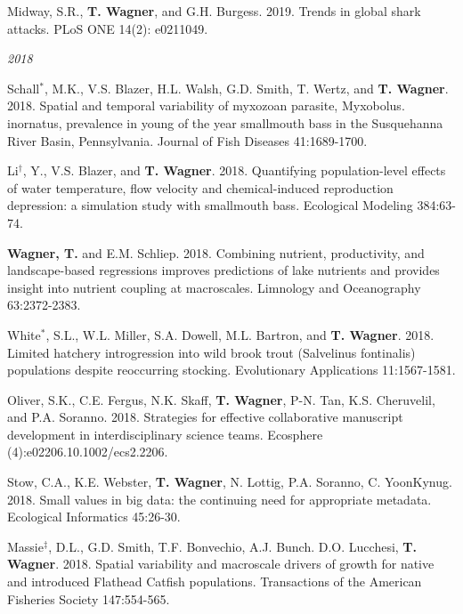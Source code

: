 \documentclass[10pt]{article}
\begin{document}
\begin{flushleft}
\begin{etaremune}[start=91]
\item Midway, S.R., \textbf{T. Wagner}, and G.H. Burgess. 2019. Trends in global shark attacks. PLoS ONE
14(2): e0211049.

\end{etaremune}

\emph{2018}
\begin{etaremune}[start=81]
\item Schall$^*$, M.K., V.S. Blazer, H.L. Walsh, G.D. Smith, T. Wertz, and \textbf{T. Wagner}. 2018. Spatial and temporal variability of myxozoan parasite, Myxobolus. inornatus, prevalence in young of the year smallmouth bass in the Susquehanna River Basin, Pennsylvania. Journal of Fish Diseases 41:1689-1700.

\item Li$^\dagger$, Y., V.S. Blazer, and \textbf{T. Wagner}. 2018. Quantifying population-level effects of water temperature, flow velocity and chemical-induced reproduction depression: a simulation study with smallmouth bass. Ecological Modeling 384:63-74.

\item {\bf Wagner, T.} and E.M. Schliep. 2018. Combining nutrient, productivity, and landscape-based regressions improves predictions of lake nutrients and provides insight into nutrient coupling at macroscales. Limnology and Oceanography 63:2372-2383.

\item White$^*$, S.L., W.L. Miller, S.A. Dowell, M.L. Bartron, and {\bf T. Wagner}.  2018. Limited hatchery introgression into wild brook trout (Salvelinus fontinalis) populations despite reoccurring stocking. Evolutionary Applications 11:1567-1581.

\item Oliver, S.K., C.E. Fergus, N.K. Skaff, {\bf T. Wagner}, P-N. Tan, K.S. Cheruvelil, and P.A. Soranno. 2018. Strategies for effective collaborative manuscript development in interdisciplinary science teams. Ecosphere (4):e02206.10.1002/ecs2.2206.

\item Stow, C.A., K.E. Webster, {\bf T. Wagner}, N. Lottig, P.A. Soranno, C. YoonKynug. 2018. Small values in big data: the continuing need for appropriate metadata. Ecological Informatics 45:26-30. 

\item Massie$^\ddagger$, D.L., G.D. Smith, T.F. Bonvechio, A.J. Bunch. D.O. Lucchesi, {\bf T. Wagner}. 2018. Spatial variability and macroscale drivers of growth for native and introduced Flathead Catfish populations. Transactions of the American Fisheries Society 147:554-565.


\end{etaremune}
\end{flushleft}
\end{document}
